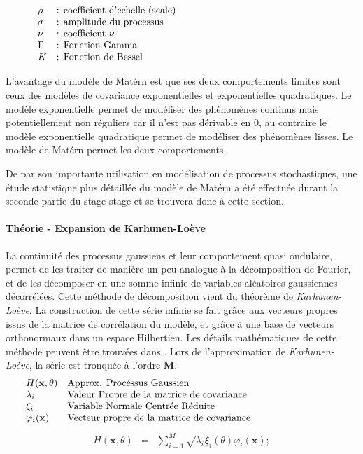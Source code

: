 \documentclass[a4paper,10pt]{article}
\begin{document}
   \[
      \begin{array}{lp{0.8\linewidth}}	
	    \rho   & : coefficient d'echelle (scale) \\
	    \sigma & : amplitude du processus \\
		\nu    & : coefficient $\nu$ 	\\
		\Gamma & : Fonction Gamma \\
		K      & : Fonction de Bessel
      \end{array}
   \]	

L'avantage du modèle de Matérn est que ses deux comportements limites sont ceux des modèles de covariance exponentielles et exponentielles  quadratiques. Le modèle exponentielle permet de modéliser des phénomènes continus mais potentiellement non réguliers car il n'est pas dérivable en 0, au contraire le modèle exponentielle quadratique permet de modéliser des phénomènes lisses. Le modèle de Matérn permet les deux comportements. \smallskip

De par son importante utilisation en modélisation de processus stochastiques, une étude statistique plus détaillée du modèle de Matérn a été effectuée durant la seconde partie du stage stage et se trouvera donc à cette section. \smallskip 

\paragraph{Théorie - Expansion de Karhunen-Loève} 

La continuité des processus gaussiens et leur comportement quasi ondulaire, permet de les traiter de manière un peu analogue à la décomposition de Fourier, et de les décomposer en une somme infinie de variables aléatoires gaussiennes décorrélées. Cette méthode de décomposition vient du théorème de \emph{Karhunen-Loève}. \smallskip
La construction de cette série infinie se fait grâce aux vecteurs propres issus de la matrice de corrélation du modèle, et grâce à une base de vecteurs orthonormaux dans un espace Hilbertien. Les détails mathématiques de cette méthode peuvent être trouvées dans \cite{Sudret2000Jan}. \smallskip
Lors de l’approximation de \emph{Karhunen-Loève}, la série est tronquée à l'ordre \textbf{M}.
   \[
      \begin{array}{lp{0.8\linewidth}}
         H(\textbf{x}, \theta) & Approx. Procéssus Gaussien \\
         \lambda_{i}          & Valeur Propre de la matrice de covariance \\
         \xi_{i}             & Variable Normale Centrée Réduite \\
         \varphi_{i}(\textbf{x}) & Vecteur propre de la matrice de covariance
      \end{array}
   \]
   \begin{eqnarray}
H(\textbf{x}, \theta) & = & \sum_{i=1}^{M}\sqrt{\lambda_{i}}\xi_{i}(\theta)\varphi_{i}(\textbf{x});
   \end{eqnarray}\\
\end{document}
